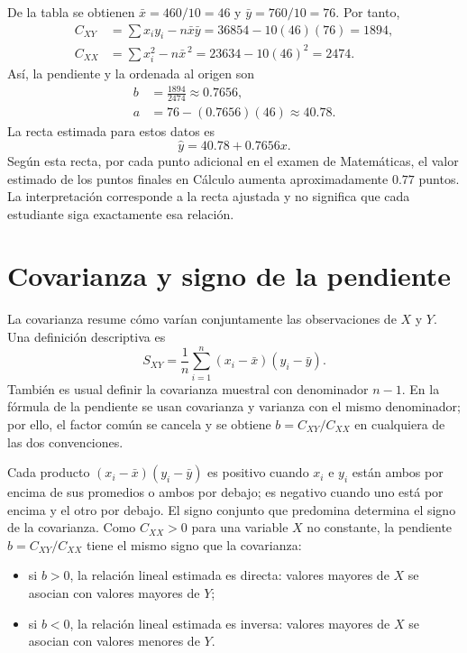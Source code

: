 De la tabla se obtienen $\bar{x}=460/10=46$ y $\bar{y}=760/10=76$. Por tanto,
\begin{align*}
C_{XY}&=\sum x_iy_i-n\bar{x}\bar{y}
=36854-10(46)(76)=1894,\\
C_{XX}&=\sum x_i^2-n\bar{x}^{\,2}
=23634-10(46)^2=2474.
\end{align*}
Así, la pendiente y la ordenada al origen son
\begin{align*}
b&=\frac{1894}{2474}\approx0.7656,\\
a&=76-(0.7656)(46)\approx40.78.
\end{align*}
La recta estimada para estos datos es
\[
\widehat y=40.78+0.7656x.
\]
Según esta recta, por cada punto adicional en el examen de Matemáticas, el valor estimado de los puntos finales en Cálculo aumenta aproximadamente $0.77$ puntos. La interpretación corresponde a la recta ajustada y no significa que cada estudiante siga exactamente esa relación.

\section{Covarianza y signo de la pendiente}

La covarianza resume cómo varían conjuntamente las observaciones de $X$ y $Y$. Una definición descriptiva es
\[
S_{XY}=\frac{1}{n}\sum_{i=1}^{n}(x_i-\bar{x})(y_i-\bar{y}).
\]
También es usual definir la covarianza muestral con denominador $n-1$. En la fórmula de la pendiente se usan covarianza y varianza con el mismo denominador; por ello, el factor común se cancela y se obtiene $b=C_{XY}/C_{XX}$ en cualquiera de las dos convenciones.

Cada producto $(x_i-\bar{x})(y_i-\bar{y})$ es positivo cuando $x_i$ e $y_i$ están ambos por encima de sus promedios o ambos por debajo; es negativo cuando uno está por encima y el otro por debajo. El signo conjunto que predomina determina el signo de la covarianza. Como $C_{XX}>0$ para una variable $X$ no constante, la pendiente $b=C_{XY}/C_{XX}$ tiene el mismo signo que la covarianza:

\begin{itemize}
    \item si $b>0$, la relación lineal estimada es directa: valores mayores de $X$ se asocian con valores mayores de $Y$;
    \item si $b<0$, la relación lineal estimada es inversa: valores mayores de $X$ se asocian con valores menores de $Y$.
\end{itemize}

